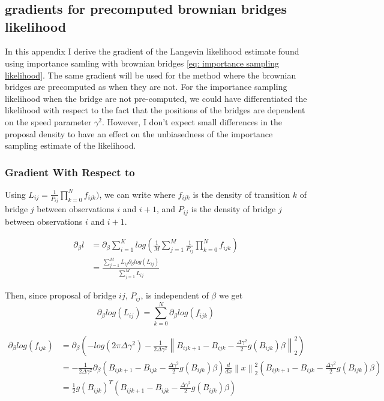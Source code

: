 \chapter{}
\label{Appendix C}




\section{gradients for precomputed brownian bridges likelihood}

In this appendix I derive the gradient of the Langevin likelihood estimate found using importance samling with brownian bridges \ref{eq: importance sampling likelihood}. The same gradient will be used for the method where the brownian bridges are precomputed as when they are not. For the importance sampling likelihood when the bridge are not pre-computed, we could have differentiated the likelihood with respect to the fact that the positions of the bridges are dependent on the speed parameter $\gamma^2$. However, I don't expect small differences in the proposal density to have an effect on the unbiasedness of the importance sampling estimate of the likelihood.

\subsection{Gradient With Respect to \beta}
Using $L_{ij} = \frac{1}{P_{ij}}\prod_{k=0}^N f_{ijk})$,  we can write where $f_{ijk}$ is the density of transition $k$ of bridge $j$ between observations $i$ and $i+1$, and $P_{ij}$ is the density of bridge $j$ between observations $i$ and $i+1$.


\begin{equation} 
\begin{split}
\partial_\beta l & =  \partial_\beta \sum_{i=1}^K log(\frac{1}{M}\sum_{j=1}^M\frac{1}{P_{ij}}\prod_{k=0}^N f_{ijk}) \\
    & =  \frac{\sum_{j=1}^ML_{ij}\partial_\beta log(L_{ij})}{\sum_{j=1}^ML_{ij}}
\end{split}
\end{equation}


Then, since proposal of bridge $ij$, $P_{ij}$, is independent of $\beta$ we get
$$
\partial_\beta log(L_{ij}) =  \sum_{k=0}^N \partial_\beta log(f_{ijk})
$$


\begin{equation} 
\begin{split}
\partial_\beta log(f_{ijk}) & = \partial_\beta (-log(2\pi \Delta \gamma^2) - \frac{1}{2\Delta \gamma^2} \left\lVert B_{ijk+1} - B_{ijk} - \frac{\Delta\gamma^2}{2} g(B_{ijk})\beta \right\rVert_2^2) \\
& = -\frac{1}{2\Delta\gamma^2}\partial_\beta (B_{ijk+1} - B_{ijk} - \frac{\Delta\gamma^2}{2} g(B_{ijk})\beta) \frac{d}{dx} \left\lVert x \right\rVert_2^2(B_{ijk+1} - B_{ijk} - \frac{\Delta\gamma^2}{2} g(B_{ijk})\beta) \\
& = \frac{1}{2} g(B_{ijk})^T(B_{ijk+1} - B_{ijk} - \frac{\Delta\gamma^2}{2} g(B_{ijk})\beta)
\end{split}
\end{equation}




